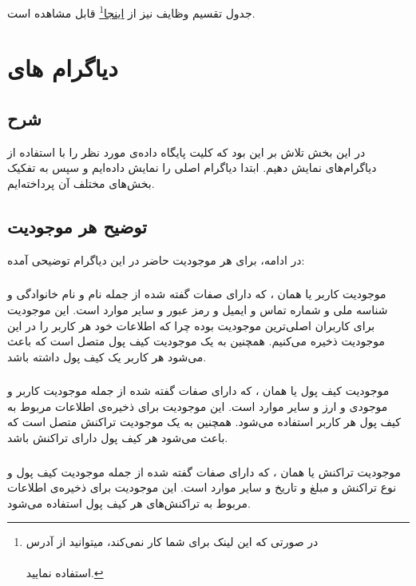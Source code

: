 \documentclass{book}
\begin{document}
        جدول تقسیم وظایف نیز از \href{https://docs.google.com/spreadsheets/d/1x1Guh4HTWLyG9GTomZEtesp5cjIGez9m9Day3bS_kgM/edit?usp=sharing}{\underline{اینجا}}\footnote{در صورتی که این لینک برای شما کار نمی‌کند، میتوانید از آدرس \\\scriptsize{}\small\\ استفاده نمایید.} قابل مشاهده است.
        \chapter{دیاگرام های }
        \section{شرح}
        در این بخش تلاش بر این بود که کلیت پایگاه داده‌ی مورد نظر را با استفاده از دیاگرام‌های  نمایش دهیم. ابتدا دیاگرام  اصلی را نمایش داده‌ایم و سپس به تفکیک بخش‌های مختلف آن پرداخته‌ایم.
        \section{توضیح هر موجودیت}
        در ادامه، برای هر موجودیت حاضر در این دیاگرام توضیحی آمده:

        \subsection{}
        موجودیت کاربر یا همان ، که دارای صفات گفته شده از جمله نام و نام خانوادگی و شناسه ملی و شماره تماس و ایمیل و رمز عبور و سایر موارد است. این موجودیت برای کاربران اصلی‌ترین موجودیت بوده چرا که اطلاعات خود هر کاربر را در این موجودیت ذخیره می‌کنیم. همچنین به یک موجودیت کیف پول متصل است که باعث می‌شود هر کاربر یک کیف پول داشته باشد.

        \subsection{}
        موجودیت کیف پول یا همان ، که دارای صفات گفته شده از جمله موجودیت کاربر و موجودی و ارز و سایر موارد است. این موجودیت برای ذخیره‌ی اطلاعات مربوط به کیف پول هر کاربر استفاده می‌شود. همچنین به یک موجودیت تراکنش متصل است که باعث می‌شود هر کیف پول دارای تراکنش باشد.

        \subsection{}
        موجودیت تراکنش یا همان ، که دارای صفات گفته شده از جمله موجودیت کیف پول و نوع تراکنش و مبلغ و تاریخ و سایر موارد است. این موجودیت برای ذخیره‌ی اطلاعات مربوط به تراکنش‌های هر کیف پول استفاده می‌شود.
\end{document}
